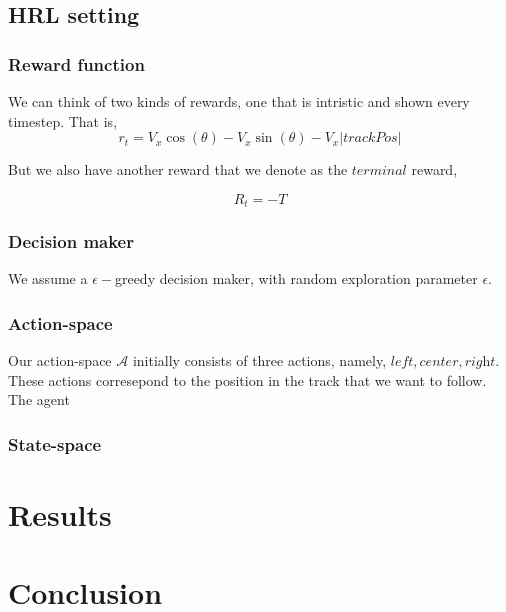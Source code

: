 \documentclass{article}
\begin{document}
\subsection{HRL setting}

\subsubsection{Reward function}

We can think of two kinds of rewards, one that is intristic and shown every timestep. That is,  
\[
r_t = V_x \cos(\theta) - V_x\sin(\theta)-V_x|trackPos|
\]

But we also have another reward that we denote as the $\textit{terminal}$ reward,

\[
R_t = -T
\]
\subsubsection{Decision maker}
We assume a $\epsilon-$greedy decision maker, with random exploration parameter $\epsilon$.

\subsubsection{Action-space}
Our action-space $\mathcal{A}$ initially consists of three actions, namely, $\textit{left}, \textit{center}, \textit{right}$. These actions corresepond to the position in the track that we want to follow. The agent 

\subsubsection{State-space}


\section{Results}

\section{Conclusion}
\end{document}
